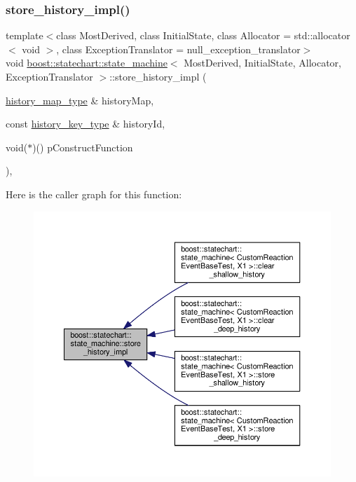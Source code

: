 \subsubsection{\texorpdfstring{store\+\_\+history\+\_\+impl()}{store\_history\_impl()}}
{\footnotesize\ttfamily template$<$class Most\+Derived, class Initial\+State, class Allocator = std\+::allocator$<$ void $>$, class Exception\+Translator = null\+\_\+exception\+\_\+translator$>$ \\
void \mbox{\hyperlink{classboost_1_1statechart_1_1state__machine}{boost\+::statechart\+::state\+\_\+machine}}$<$ Most\+Derived, Initial\+State, Allocator, Exception\+Translator $>$\+::store\+\_\+history\+\_\+impl (\begin{DoxyParamCaption}\item[{\mbox{\hyperlink{classboost_1_1statechart_1_1state__machine_a9b8fdd7b5af3b0c9143f9d6fb4036ff7}{history\+\_\+map\+\_\+type}} \&}]{history\+Map,  }\item[{const \mbox{\hyperlink{classboost_1_1statechart_1_1state__machine_a4f8e1e85e0ba11488c57318b61950e32}{history\+\_\+key\+\_\+type}} \&}]{history\+Id,  }\item[{void($\ast$)()}]{p\+Construct\+Function }\end{DoxyParamCaption})\hspace{0.3cm}{\ttfamily [inline]}, {\ttfamily [private]}}

Here is the caller graph for this function\+:
\nopagebreak
\begin{figure}[H]
\begin{center}
\leavevmode
\includegraphics[width=350pt]{classboost_1_1statechart_1_1state__machine_abb755807d8a21c92ec5484d747b05d14_icgraph}
\end{center}
\end{figure}
\mbox{\label{classboost_1_1statechart_1_1state__machine_a3af3b88318ab1711324e1c4b37fa055c}} 
